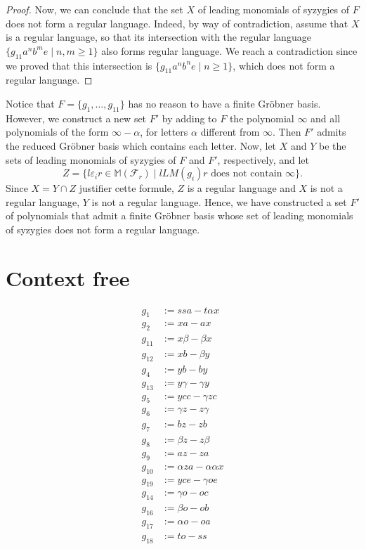 \documentclass[sigconf]{acmart}
\theoremstyle{plain}
\theoremstyle{definition}
\theoremstyle{remark}
\newcommand{\MM}{\mathbb M}
\newcommand{\LM}{LM}
\newcommand\fixmecc[1]{{\color{red}{\underline{\bf C:}} #1}}
\begin{document}
\begin{proof}
  Now, we can conclude that the set $X$ of leading monomials of syzygies of $F$ does not form a regular language.
  Indeed, by way of contradiction, assume that $X$ is a regular language, so that its
  intersection with the regular language $\{g_{11}a^nb^me \;|\; n, m \geq 1\}$ also forms regular language.
  We reach a contradiction since we proved that this intersection is $\{g_{11}a^nb^ne \;|\; n \geq 1 \}$, which does not form a regular language.
\end{proof}

Notice that $F=\{g_1,\dots,g_{11}\}$ has no reason to have a finite Gröbner basis. However, we construct a new set $F'$ by adding to $F$ the polynomial $\infty$ and all polynomials of the form $\infty-\alpha$, for letters $\alpha$ different from $\infty$. Then $F'$ admits the reduced Gröbner basis which contains each letter.
Now, let $X$ and $Y$ be the sets of leading monomials of syzygies of $F$ and $F'$, respectively, and let 
$$Z=\{l\varepsilon_ir \in \MM(\mathscr{F}_r) \;|\; l \LM(g_i) r \mbox{ does not contain } \infty\}.$$
Since $X=Y\cap Z$ \fixmecc{justifier cette formule}, $Z$ is a regular language and $X$ is not a regular language, $Y$ is not a regular language. Hence, we have constructed a set $F'$ of polynomials that admit a finite Gröbner basis whose set of leading monomials of syzygies does not form a regular language. 


\section{Context free}

\begin{align*}
g_1 & := ssa - t\alpha x \\ 
g_2 & := xa - ax \\ 
g_{11} & := x\beta-\beta x\\ 
g_{12} & := xb-\beta y \\ 
g_4 & := yb-by\\ 
g_{13} & := y\gamma-\gamma y \\
g_5 & := ycc-\gamma zc \\ 
g_6 & :=  \gamma z-z\gamma\\ 
g_7 & := bz-zb \\
g_8 & := \beta z-z\beta \\
g_9 & := az-za \\ 
g_{10} & := \alpha za-\alpha\alpha x  \\ 
g_{19} & := yce - \gamma oe \\
g_{14} & := \gamma o-oc \\
g_{16} & := \beta o-ob \\ 
g_{17} & := \alpha o-oa \\ 
g_{18} & := to-ss
\end{align*}
\end{document}
